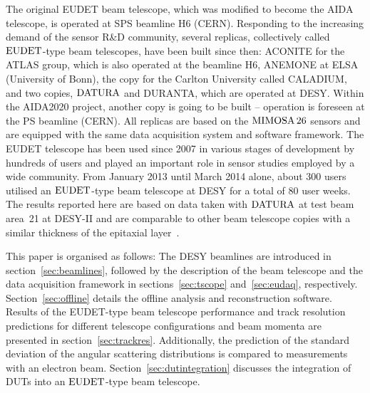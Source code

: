 The original EUDET beam telescope, which was modified to become the AIDA telescope, is operated at SPS beamline H6 (CERN).
Responding to the increasing demand of the sensor R\&D community, several replicas, collectively called $\textrm{EUDET}$-type beam telescopes, have been built since then:
 ACONITE for the ATLAS group, which is also operated at the beamline H6, ANEMONE at ELSA (University of Bonn), the copy for the Carlton University called CALADIUM, 
 and two copies, $\textrm{DATURA}$ and DURANTA, which are operated at DESY. 
 Within the AIDA2020 project, another copy is going to be built -- operation is foreseen at the PS beamline (CERN).
All replicas are based on the $\textrm{MIMOSA\,26}$ sensors and are equipped with the same data acquisition system and software framework. 
The EUDET telescope has been used since 2007 in various stages of development by hundreds of users and played an important role in sensor studies employed by a wide community. 
From January 2013 until March 2014 alone, about 300 users utilised an $\textrm{EUDET}$-type beam telescope at DESY for a total of 80 user weeks. 
The results reported here are based on data taken with $\textrm{DATURA}$ at test beam area~21 at {DESY-II} and are comparable to other beam telescope copies with
a similar thickness of the epitaxial layer~\cite{desy-tscopes-main}. 

This paper is organised as follows: 
The DESY beamlines are introduced in section~\ref{sec:beamlines}, followed by the description of the beam telescope
 and the data acquisition framework in sections~\ref{sec:tscope} and~\ref{sec:eudaq}, respectively.
Section~\ref{sec:offline} details the offline analysis and reconstruction software. 
Results of the EUDET-type beam telescope performance and track resolution predictions for different telescope configurations and beam momenta are presented in section~\ref{sec:trackres}. 
Additionally, the prediction of the standard deviation of the angular scattering distributions is compared to measurements with an electron beam. 
Section~\ref{sec:dutintegration} discusses the integration of DUTs into an $\textrm{EUDET}$-type beam telescope. 
